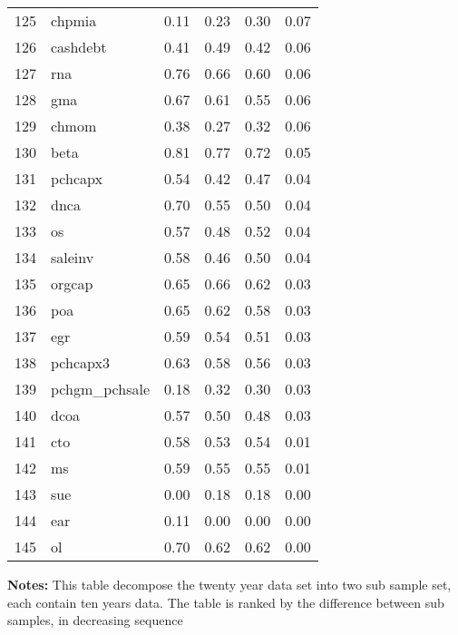 \documentclass[12pt]{article}
\begin{document}
\begin{footnotesize}
\begin{longtable}{rl|c|c|c|c}
  125 & chpmia & 0.11 & 0.23 & 0.30 & 0.07 \\ 
  126 & cashdebt & 0.41 & 0.49 & 0.42 & 0.06 \\ 
  127 & rna & 0.76 & 0.66 & 0.60 & 0.06 \\ 
  128 & gma & 0.67 & 0.61 & 0.55 & 0.06 \\ 
  129 & chmom & 0.38 & 0.27 & 0.32 & 0.06 \\ 
  130 & beta & 0.81 & 0.77 & 0.72 & 0.05 \\ 
  131 & pchcapx & 0.54 & 0.42 & 0.47 & 0.04 \\ 
  132 & dnca & 0.70 & 0.55 & 0.50 & 0.04 \\ 
  133 & os & 0.57 & 0.48 & 0.52 & 0.04 \\ 
  134 & saleinv & 0.58 & 0.46 & 0.50 & 0.04 \\ 
  135 & orgcap & 0.65 & 0.66 & 0.62 & 0.03 \\ 
  136 & poa & 0.65 & 0.62 & 0.58 & 0.03 \\ 
  137 & egr & 0.59 & 0.54 & 0.51 & 0.03 \\ 
  138 & pchcapx3 & 0.63 & 0.58 & 0.56 & 0.03 \\ 
  139 & pchgm\_pchsale & 0.18 & 0.32 & 0.30 & 0.03 \\ 
  140 & dcoa & 0.57 & 0.50 & 0.48 & 0.03 \\ 
  141 & cto & 0.58 & 0.53 & 0.54 & 0.01 \\ 
  142 & ms & 0.59 & 0.55 & 0.55 & 0.01 \\ 
  143 & sue & 0.00 & 0.18 & 0.18 & 0.00 \\ 
  144 & ear & 0.11 & 0.00 & 0.00 & 0.00 \\ 
  145 & ol & 0.70 & 0.62 & 0.62 & 0.00 \\ 
   \hline

	\end{longtable}
\bigskip
{\bf Notes:}
This table decompose the twenty year data set into two sub sample set, each contain ten years data. The table is ranked by the difference between  sub samples, in decreasing sequence
\end{footnotesize}
\end{document}
